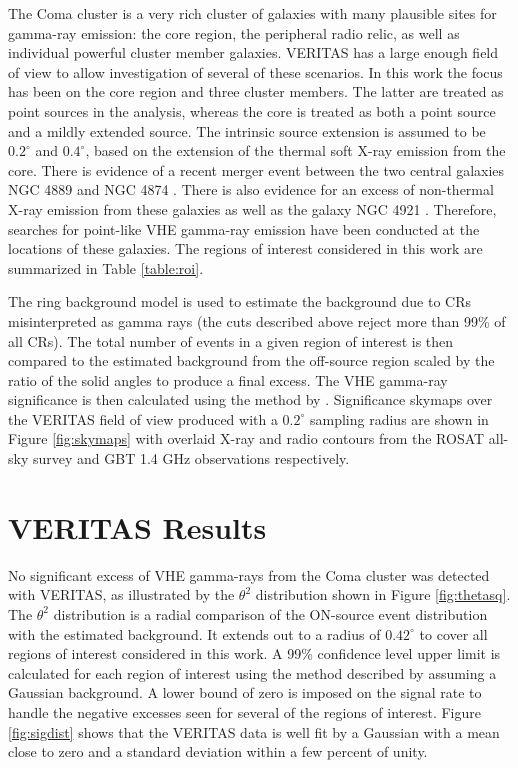 \documentclass[12pt,manuscript]{aastex}
\begin{document}
The Coma cluster is a very rich cluster of galaxies with many plausible sites for gamma-ray emission: the core region, the peripheral radio relic, as well as individual powerful cluster member galaxies. VERITAS has a large enough field of view to allow investigation of several of these scenarios. In this work the focus has been on the core region and three cluster members. The latter are treated as point sources in the analysis, whereas the core is treated as both a point source and a mildly extended source. The intrinsic source extension is assumed to be $0.2^{\circ}$ and $0.4^{\circ}$, based on the extension of the thermal soft X-ray emission from the core. There is evidence of a recent merger event between the two central galaxies NGC 4889 and NGC 4874 \citep{article:Tribble:1993}. There is also evidence for an excess of non-thermal X-ray emission from these galaxies as well as the galaxy NGC 4921 \citep{article:Neumann_etal:2003}. Therefore, searches for point-like VHE gamma-ray emission have been conducted at the locations of these galaxies. The regions of interest considered in this work are summarized in Table \ref{table:roi}.

The ring background model \citep{article:Aharonian_etal:2001} is used to estimate the background due to CRs misinterpreted as gamma rays (the cuts described above reject more than 99\% of all CRs). The total number of events in a given region of interest is then compared to the estimated background from the off-source region scaled by the ratio of the solid angles to produce a final excess. The VHE gamma-ray significance is then calculated using the method by \citet{article:LiMa:1983}. Significance skymaps over the VERITAS field of view produced with a $0.2^{\circ}$ sampling radius are shown in Figure \ref{fig:skymaps} with overlaid X-ray and radio contours from the ROSAT all-sky survey \citep{article:BrielHenryBohringer:1992}  and GBT 1.4 GHz observations \citep{article:BrownRudnick:2010} respectively.

\section{VERITAS Results}
No significant excess of VHE gamma-rays from the Coma cluster was detected with VERITAS, as illustrated by the $\theta^{2}$ distribution shown in Figure \ref{fig:thetasq}. The $\theta^{2}$ distribution is a radial comparison of the ON-source event distribution with the estimated background. It extends out to a radius of $0.42^{\circ}$ to cover all regions of interest considered in this work. A 99\% confidence level upper limit is calculated for each region of interest using the method described by \citet{article:Rolke_etal:2005} assuming a Gaussian background. A lower bound of zero is imposed on the signal rate to handle the negative excesses seen for several of the regions of interest. Figure \ref{fig:sigdist} shows that the VERITAS data is well fit by a Gaussian with a mean close to zero and a standard deviation within a few percent of unity. 
\end{document}
